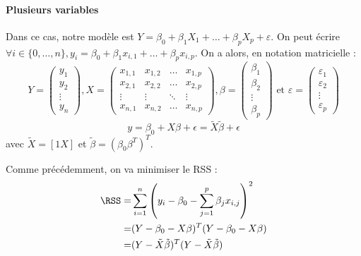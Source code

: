         \paragraph{Plusieurs variables} Dans ce cas, notre modèle est \(Y = \beta_0 + \beta_1 X_1 + \dots + \beta_p X_p + \varepsilon\). On peut écrire \(\forall i \in \{0, \dots, n\}, y_i = \beta_0 + \beta_1 x_{i,1} + \dots + \beta_p x_{i,p}\). On a alors, en notation matricielle :
        \[
            Y = \begin{pmatrix}
                y_1\\
                y_2\\
                \vdots\\
                y_n
            \end{pmatrix}, X = \begin{pmatrix}
                x_{1,1} & x_{1,2} & \dots & x_{1,p}\\
                x_{2,1} & x_{2,2} & \dots & x_{2,p}\\
                \vdots  & \vdots  & \ddots & \vdots\\
                x_{n,1} & x_{n,2} & \dots & x_{n,p}
            \end{pmatrix}, \beta = \begin{pmatrix}
                \beta_1\\
                \beta_2\\
                \vdots\\
                \beta_p
            \end{pmatrix} \text{ et } \varepsilon = \begin{pmatrix}
                \varepsilon_1\\
                \varepsilon_2\\
                \vdots\\
                \varepsilon_p
            \end{pmatrix}
        \]
        \[
            y = \beta_0 + X\beta + \epsilon = \tilde{X}\tilde{\beta} + \epsilon
        \]
        avec \(\tilde{X} = [1 X]\) et \(\tilde{\beta} = \left(\beta_0 \beta^T\right)^T\).

        Comme précédemment, on va minimiser le RSS :
        \begin{align*}
            \RSS =& \sum_{i=1}^n\left(y_i - \beta_0 - \sum_{j=1}^p \beta_j x_{i,j}\right)^2\\
            =& (Y - \beta_0 - X\beta)^T (Y - \beta_0 - X\beta)\\
            =& (Y - \tilde{X}\tilde{\beta})^T (Y - \tilde{X}\tilde{\beta})
        \end{align*}

